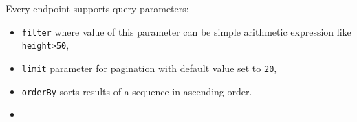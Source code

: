 Every endpoint supports query parameters:
\begin{itemize}
    \item \texttt{filter} where value of this parameter can be simple arithmetic expression like \texttt{height>50},
    \item \texttt{limit} parameter for pagination with default value set to \texttt{20},
    \item \texttt{orderBy} sorts results of a sequence in ascending order.
    \item {}
\end{itemize}
 



